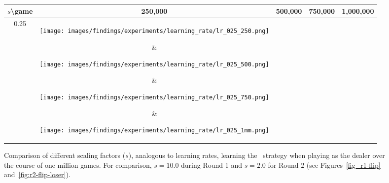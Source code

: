 \begin{figure}[h]
	\centering

	\begin{tabular}{c | c c c c}
		$s$\textbackslash game & 250,000 & 500,000 & 750,000 & 1,000,000 \\
		\hline
		0.25 & %
			\parbox[c]{5em}{\texttt{[image: images/findings/experiments/learning\_rate/lr\_025\_250.png]}} & %
			\parbox[c]{5em}{\texttt{[image: images/findings/experiments/learning\_rate/lr\_025\_500.png]}} & %
			\parbox[c]{5em}{\texttt{[image: images/findings/experiments/learning\_rate/lr\_025\_750.png]}} & %
			\parbox[c]{5em}{\texttt{[image: images/findings/experiments/learning\_rate/lr\_025\_1mm.png]}} \\ %
		\\
		0.50 & 
			\parbox[c]{5em}{\texttt{[image: images/findings/experiments/learning\_rate/lr\_050\_250.png]}} & %
			\parbox[c]{5em}{\texttt{[image: images/findings/experiments/learning\_rate/lr\_050\_500.png]}} & %
			\parbox[c]{5em}{\texttt{[image: images/findings/experiments/learning\_rate/lr\_050\_750.png]}} & %
			\parbox[c]{5em}{\texttt{[image: images/findings/experiments/learning\_rate/lr\_050\_1mm.png]}} \\ %
		\\
		1.00 & 
			\parbox[c]{5em}{\texttt{[image: images/findings/experiments/learning\_rate/lr\_100\_250.png]}} & %
			\parbox[c]{5em}{\texttt{[image: images/findings/experiments/learning\_rate/lr\_100\_500.png]}} & %
			\parbox[c]{5em}{\texttt{[image: images/findings/experiments/learning\_rate/lr\_100\_750.png]}} & %
			\parbox[c]{5em}{\texttt{[image: images/findings/experiments/learning\_rate/lr\_100\_1mm.png]}} \\ %
		\\
		1.50 & 
			\parbox[c]{5em}{\texttt{[image: images/findings/experiments/learning\_rate/lr\_150\_250.png]}} & %
			\parbox[c]{5em}{\texttt{[image: images/findings/experiments/learning\_rate/lr\_150\_500.png]}} & %
			\parbox[c]{5em}{\texttt{[image: images/findings/experiments/learning\_rate/lr\_150\_750.png]}} & %
			\parbox[c]{5em}{\texttt{[image: images/findings/experiments/learning\_rate/lr\_150\_1mm.png]}} \\ %
	\end{tabular}

\caption{
	Comparison of different scaling factors ($s$),
	analogous to learning rates,
	learning the \handmaxavg\ strategy
	when playing as the dealer
	over the course of one million games.
	For comparison, $s = 10.0$ during Round 1 and $s = 2.0$ for Round 2
	(see Figures~\ref{fig_r1-flip} and~\ref{fig:r2-flip-loser}).
	}
\label{fig:expts-lr-comp}
\end{figure}
